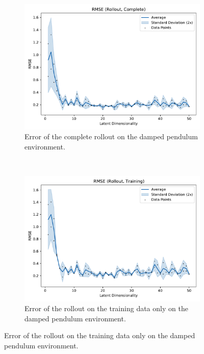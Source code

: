 			\begin{figure}
				\centering
				\begin{subfigure}{0.7\linewidth}
					\centering
					\includegraphics[width=\linewidth]{figures/results/pendulum-damped/latent-dim/comparison-rmse-rollout-mean-vs-latent-dim.pdf}
					\caption{Error of the complete rollout on the damped pendulum environment.}
					\label{fig:pendulumDampedRmseComplete}
				\end{subfigure} \\
				\begin{subfigure}{0.5\linewidth}
					\centering
					\includegraphics[width=\linewidth]{figures/results/pendulum-damped/latent-dim/comparison-rmse-rollout-train-mean-vs-latent-dim.pdf}
					\caption{Error of the rollout on the training data only on the damped pendulum environment.}

\end{subfigure}
\end{figure}
